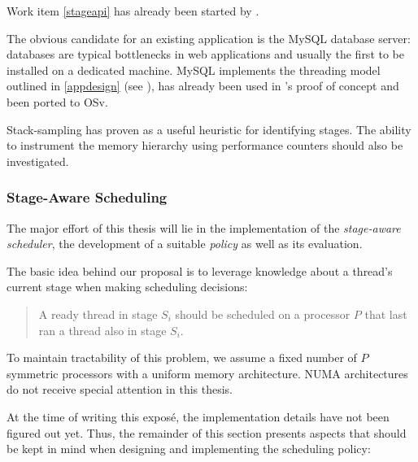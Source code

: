 \documentclass{article}
\begin{document}
Work item \ref{stageapi} has already been started by \citeauthor{gottschlag2017}.

The obvious candidate for an existing application is the MySQL database server:
databases are typical bottlenecks in web applications and usually the first to be installed on a dedicated machine.
MySQL implements the threading model outlined in \ref{appdesign} (see \cite{mysqlThreading}),
has already been used in \citeauthor{gottschlag2017}'s proof of concept
and been ported to OSv. \label{willusemysqlfirst}

Stack-sampling has proven as a useful heuristic for identifying stages.
The ability to instrument the memory hierarchy using performance counters should also be investigated.


\subsubsection{Stage-Aware Scheduling}\label{stageawaresched}

The major effort of this thesis will lie in the implementation of the \emph{stage-aware scheduler}, the development of a suitable \emph{policy} as well as its evaluation.

The basic idea behind our proposal is to leverage knowledge about a thread's current stage when making scheduling decisions:
\begin{quote} %
A ready thread in stage $S_i$ should be scheduled on a processor $P$ that last ran a thread also in stage $S_i$.
\end{quote}

To maintain tractability of this problem, we assume a fixed number of $P$ symmetric processors with a uniform memory architecture.
NUMA architectures do not receive special attention in this thesis. %

At the time of writing this exposé, the implementation details have not been figured out yet.
Thus, the remainder of this section presents aspects that should be kept in mind when designing and implementing the scheduling policy:
\end{document}
